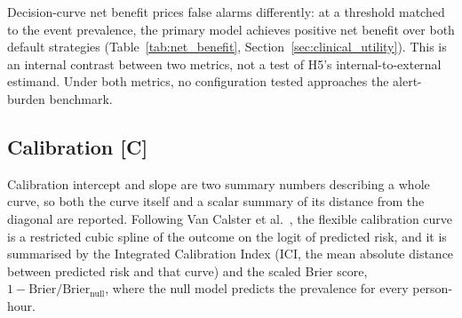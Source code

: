 Decision-curve net benefit prices false alarms differently: at a threshold
matched to the event prevalence, the primary model achieves positive net
benefit over both default strategies (Table~\ref{tab:net_benefit},
Section~\ref{sec:clinical_utility}). This is an internal contrast between two
metrics, not a test of H5's internal-to-external estimand. Under both metrics,
no configuration tested approaches the alert-burden benchmark.

\subsection{Calibration \texorpdfstring{[C]}{[C]}}
\label{sec:calibration_results}

Calibration intercept and slope are two summary numbers describing a whole
curve, so both the curve itself and a scalar summary of its distance from the
diagonal are reported. Following Van Calster et al.\
\cite{vancalster2019calibration}, the flexible calibration curve is a
restricted cubic spline of the outcome on the logit of predicted risk, and it
is summarised by the Integrated Calibration Index (ICI, the mean absolute
distance between predicted risk and that curve) and the scaled Brier score,
$1 - \text{Brier}/\text{Brier}_{\text{null}}$, where the null model predicts
the prevalence for every person-hour.

